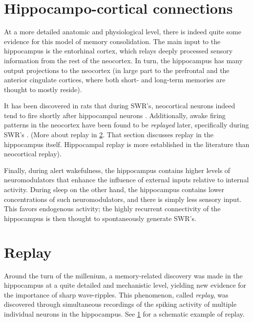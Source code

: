 \section{Hippocampo-cortical connections}
\label{sec:HC-neocortex}

At a more detailed anatomic and physiological level, there is indeed quite some evidence for this model of memory consolidation. The main input to the hippocampus is the entorhinal cortex, which relays deeply processed sensory information from the rest of the neocortex. In turn, the hippocampus has many output projections to the neocortex (in large part to the prefrontal and the anterior cingulate cortices, where both short- and long-term memories are thought to mostly reside).

It has been discovered in rats that during SWR's, neocortical neurons indeed tend to fire shortly after hippocampal neurons \cite{Wierzynski2009}. Additionally, awake firing patterns in the neocortex have been found to be \emph{replayed} later, specifically during SWR's \cite{Peyrache2009}. (More about replay in \cref{sec:replay}. That section discusses replay in the hippocampus itself. Hippocampal replay is more established in the literature than neocortical replay).

Finally, during alert wakefulness, the hippocampus contains higher levels of neuromodulators that enhance the influence of external inputs relative to internal activity. During sleep on the other hand, the hippocampus contains lower concentrations of such neuromodulators, and there is simply less sensory input. This favors endogenous activity; the highly recurrent connectivity of the hippocampus is then thought to spontaneously generate SWR's.




\begin{figure}
\label{fig:replay}
\end{figure}

\section{Replay}
\label{sec:replay}

Around the turn of the millenium, a memory-related discovery was made in the hippocampus at a quite detailed and mechanistic level, yielding new evidence for the importance of sharp wave-ripples. This phenomenon, called \emph{replay}, was discovered through simultaneous recordings of the spiking activity of multiple individual neurons in the hippocampus.\footnotemark{} See \cref{fig:replay} for a schematic example of replay.

